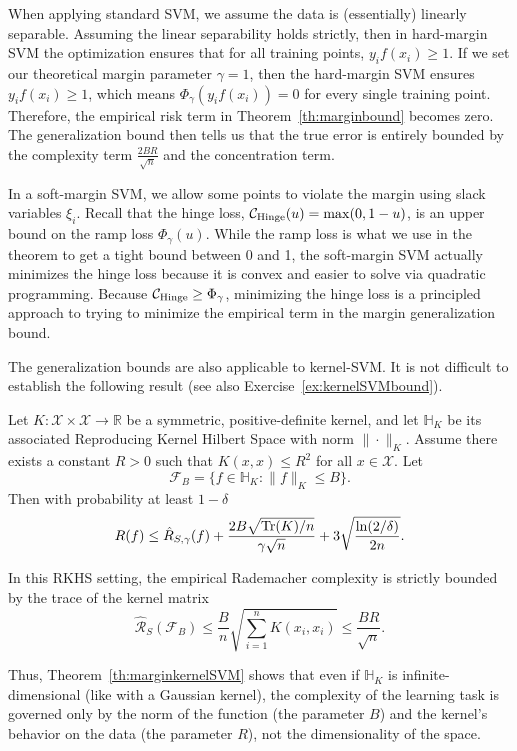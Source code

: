 When applying standard SVM, we assume the data is (essentially) linearly separable. Assuming the linear separability holds strictly,  then in hard-margin SVM the optimization ensures that for all training points, $y_i f(x_i) \geq 1$. If we set our theoretical margin parameter $\gamma = 1$, then the hard-margin SVM ensures $y_i f(x_i) \geq 1$, which means $\Phi_\gamma(y_i f(x_i)) = 0$ for every single training point. Therefore, the empirical risk term in Theorem~\ref{th:marginbound} becomes zero. The generalization bound then tells us that the true error is entirely bounded by the complexity term $\frac{2BR}{\sqrt{n}}$ and the concentration term.


In a soft-margin SVM, we allow some points to violate the margin using slack variables $\xi_i$. Recall that the hinge loss, ${\mathcal C}_{\text{Hinge}}(u) = \max(0, 1-u)$, is an upper bound on the ramp loss $\Phi_\gamma(u)$. While the ramp loss is what we use in the theorem to get a tight bound between 0 and 1,  the soft-margin SVM actually minimizes the hinge loss because it is convex and easier to solve via quadratic programming.
Because ${\mathcal C}_{\text{Hinge}} \geq \Phi_\gamma$,  minimizing the hinge loss is a principled approach to trying to minimize the empirical term in the margin generalization bound.

\medskip
The generalization bounds are also applicable to kernel-SVM. It is not difficult to establish the following result (see also Exercise~\ref{ex:kernelSVMbound}).

\begin{theorem}\label{th:marginkernelSVM}
Let $K: \mathcal{X} \times \mathcal{X} \to \mathbb{R}$ be a symmetric, positive-definite kernel, and let $\mathbb{H}_K$ be its associated Reproducing Kernel Hilbert Space with norm $\|\cdot\|_K$. Assume there exists a constant $R > 0$ such that $K(x, x) \leq R^2$ for all $x \in \mathcal{X}$.
Let 
$$\mathcal{F}_B = \{ f \in \mathbb{H}_K : \|f\|_K \leq B \}.$$
Then with probability at least $1-\delta$
$$R(f) \leq \hat{R}_{S, \gamma}(f) + \frac{2B \sqrt{\operatorname{Tr}(K)/n}}{\gamma \sqrt{n}} + 3\sqrt{\frac{\ln(2/\delta)}{2n}}.$$
\end{theorem}

\medskip
In this RKHS setting, the empirical Rademacher complexity is strictly bounded by the trace of the kernel matrix
$$\hat{\mathcal{R}}_S(\mathcal{F}_B) \leq \frac{B}{n} \sqrt{\sum_{i=1}^n K(x_i, x_i)} \leq \frac{BR}{\sqrt{n}}.$$

Thus, Theorem~\ref{th:marginkernelSVM} shows that even if $\mathbb{H}_K$ is infinite-dimensional (like with a Gaussian kernel), the complexity of the learning task is governed only by the norm of the function (the parameter $B$) and the kernel's behavior on the data (the parameter $R$), not the dimensionality of the space.




